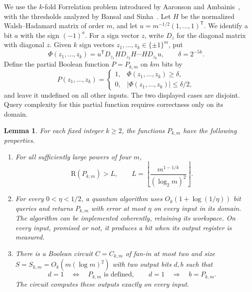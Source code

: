\documentclass[11pt]{article}
\newtheorem{lemma}[theorem]{Lemma}
\theoremstyle{definition}
\newcommand{\R}{\mathrm R}
\begin{document}
We use the $k$-fold Forrelation problem introduced by Aaronson and
Ambainis~\cite{AA18}, with the thresholds analyzed by Bansal and
Sinha~\cite{BS21}. Let $H$ be the normalized Walsh--Hadamard matrix of order $m$, and let
$u=m^{-1/2}(1,\ldots,1)^{\mathsf T}$.  We identify a bit $a$ with the sign
$(-1)^a$.  For a sign vector $z$, write $D_z$ for the diagonal matrix with
diagonal $z$.  Given $k$ sign vectors $z_1,\ldots,z_k\in\{\pm1\}^m$, put
\begin{equation}\label{eq:forrelation-form}
 \Phi(z_1,\ldots,z_k)
 =u^{\mathsf T}D_{z_1}H D_{z_2}H\cdots H D_{z_k}u,
 \qquad \delta=2^{-5k}.
\end{equation}
Define the partial Boolean function $P=P_{k,m}$ on $km$ bits by
\begin{equation}\label{eq:forrelation-promise}
 P(z_1,\ldots,z_k)=
 \begin{cases}
  1,&\Phi(z_1,\ldots,z_k)\geq\delta,\\
  0,&|\Phi(z_1,\ldots,z_k)|\leq\delta/2,
 \end{cases}
\end{equation}
and leave it undefined on all other inputs.  The two displayed cases are
disjoint.  Query complexity for this partial function requires correctness
only on its domain.

\begin{lemma}\label{lem:forrelation}
For each fixed integer $k\geq2$, the functions $P_{k,m}$ have the following
properties.
\begin{enumerate}
 \item For all sufficiently large powers of four $m$,
 \begin{equation}\label{eq:L-def}
  \R(P_{k,m})>L,
  \qquad
  L=\left\lfloor
       \frac{m^{1-1/k}}{(\log_2 m)^2}
     \right\rfloor.
 \end{equation}
 \item For every $0<\eta<1/2$, a quantum algorithm uses
 $O_k(1+\log(1/\eta))$ bit queries and returns $P_{k,m}$ with error at most
 $\eta$ on every input in its domain.  The algorithm can be implemented
 coherently, retaining its workspace.  On every input, promised or not, it
 produces a bit when its output register is measured.
 \item There is a Boolean circuit $C=C_{k,m}$ of fan-in at most two and
 size $S=S_{k,m}=O_k(m(\log m)^2)$ with two output bits $d,b$ such that
 \[
  d=1\quad\Longleftrightarrow\quad P_{k,m}\text{ is defined},
  \qquad d=1\quad\Longrightarrow\quad b=P_{k,m}.
 \]
 The circuit computes these outputs exactly on every input.
\end{enumerate}
\end{lemma}
\end{document}
